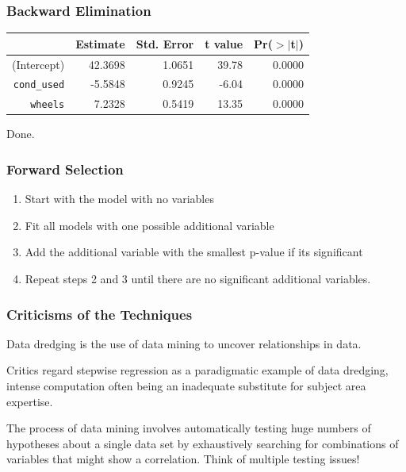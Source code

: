 \documentclass[handout]{beamer}
\begin{document}
\begin{frame}[fragile]
\frametitle{Backward Elimination}

\begin{table}[ht]
\centering
\begin{tabular}{rrrrr}
  \hline
 & Estimate & Std. Error & t value & Pr($>$$|$t$|$) \\ 
  \hline
(Intercept) & 42.3698 & 1.0651 & 39.78 & 0.0000 \\ 
  {\tt cond\_used} & -5.5848 & 0.9245 & -6.04 & 0.0000 \\ 
  {\tt wheels} & 7.2328 & 0.5419 & 13.35 & 0.0000 \\ 
   \hline
\end{tabular}
\end{table}
Done. 

\end{frame}


\begin{frame}[fragile]
\frametitle{Forward Selection}

\begin{enumerate}
\item Start with the model with no variables
\pause\item Fit all models with one possible additional variable
\pause\item Add the additional variable with the smallest p-value if its significant
\pause\item Repeat steps 2 and 3 until there are no significant additional variables.  
\end{enumerate}

\end{frame}



\begin{frame}[fragile]
\frametitle{Criticisms of the Techniques}

Data dredging is the use of data mining to uncover relationships in data.

\pause
\vspace{0.5cm}

Critics regard stepwise regression as a paradigmatic example of data dredging, intense computation often being an inadequate substitute for subject area expertise.

\pause
\vspace{0.5cm}

The process of data mining involves automatically testing huge numbers of hypotheses about a single data set by exhaustively searching for combinations of variables that might show a correlation.  Think of multiple testing issues!

\end{frame}
\end{document}
